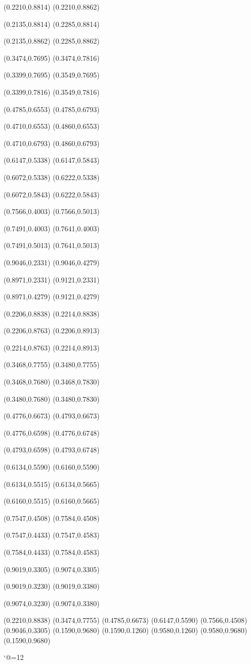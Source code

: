 \PST@Dashed(0.2210,0.8814)
(0.2210,0.8862)

\PST@Dashed(0.2135,0.8814)
(0.2285,0.8814)

\PST@Dashed(0.2135,0.8862)
(0.2285,0.8862)

\PST@Dashed(0.3474,0.7695)
(0.3474,0.7816)

\PST@Dashed(0.3399,0.7695)
(0.3549,0.7695)

\PST@Dashed(0.3399,0.7816)
(0.3549,0.7816)

\PST@Dashed(0.4785,0.6553)
(0.4785,0.6793)

\PST@Dashed(0.4710,0.6553)
(0.4860,0.6553)

\PST@Dashed(0.4710,0.6793)
(0.4860,0.6793)

\PST@Dashed(0.6147,0.5338)
(0.6147,0.5843)

\PST@Dashed(0.6072,0.5338)
(0.6222,0.5338)

\PST@Dashed(0.6072,0.5843)
(0.6222,0.5843)

\PST@Dashed(0.7566,0.4003)
(0.7566,0.5013)

\PST@Dashed(0.7491,0.4003)
(0.7641,0.4003)

\PST@Dashed(0.7491,0.5013)
(0.7641,0.5013)

\PST@Dashed(0.9046,0.2331)
(0.9046,0.4279)

\PST@Dashed(0.8971,0.2331)
(0.9121,0.2331)

\PST@Dashed(0.8971,0.4279)
(0.9121,0.4279)

\PST@Dashed(0.2206,0.8838)
(0.2214,0.8838)

\PST@Dashed(0.2206,0.8763)
(0.2206,0.8913)

\PST@Dashed(0.2214,0.8763)
(0.2214,0.8913)

\PST@Dashed(0.3468,0.7755)
(0.3480,0.7755)

\PST@Dashed(0.3468,0.7680)
(0.3468,0.7830)

\PST@Dashed(0.3480,0.7680)
(0.3480,0.7830)

\PST@Dashed(0.4776,0.6673)
(0.4793,0.6673)

\PST@Dashed(0.4776,0.6598)
(0.4776,0.6748)

\PST@Dashed(0.4793,0.6598)
(0.4793,0.6748)

\PST@Dashed(0.6134,0.5590)
(0.6160,0.5590)

\PST@Dashed(0.6134,0.5515)
(0.6134,0.5665)

\PST@Dashed(0.6160,0.5515)
(0.6160,0.5665)

\PST@Dashed(0.7547,0.4508)
(0.7584,0.4508)

\PST@Dashed(0.7547,0.4433)
(0.7547,0.4583)

\PST@Dashed(0.7584,0.4433)
(0.7584,0.4583)

\PST@Dashed(0.9019,0.3305)
(0.9074,0.3305)

\PST@Dashed(0.9019,0.3230)
(0.9019,0.3380)

\PST@Dashed(0.9074,0.3230)
(0.9074,0.3380)

\PST@Diamond(0.2210,0.8838)
\PST@Diamond(0.3474,0.7755)
\PST@Diamond(0.4785,0.6673)
\PST@Diamond(0.6147,0.5590)
\PST@Diamond(0.7566,0.4508)
\PST@Diamond(0.9046,0.3305)
\PST@Border(0.1590,0.9680)
(0.1590,0.1260)
(0.9580,0.1260)
(0.9580,0.9680)
(0.1590,0.9680)

\catcode`@=12
\fi
\endpspicture
